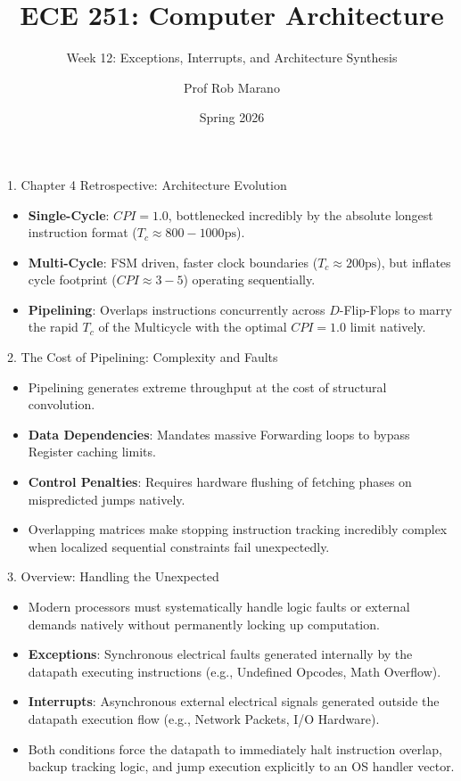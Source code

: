 \documentclass[aspectratio=169]{beamer}
\title{ECE 251: Computer Architecture}
\subtitle{Week 12: Exceptions, Interrupts, and Architecture Synthesis}
\author{Prof Rob Marano}
\date{Spring 2026}
\begin{document}
\begin{frame}
  \titlepage
\end{frame}

\begin{frame}{1. Chapter 4 Retrospective: Architecture Evolution}
\begin{itemize}
    \item \textbf{Single-Cycle}: $CPI=1.0$, bottlenecked incredibly by the absolute longest instruction format ($T_c \approx 800-1000\text{ps}$).
    \item \textbf{Multi-Cycle}: FSM driven, faster clock boundaries ($T_c \approx 200\text{ps}$), but inflates cycle footprint ($CPI \approx 3-5$) operating sequentially.
    \item \textbf{Pipelining}: Overlaps instructions concurrently across $D$-Flip-Flops to marry the rapid $T_c$ of the Multicycle with the optimal $CPI = 1.0$ limit natively.
\end{itemize}
\end{frame}

\begin{frame}{2. The Cost of Pipelining: Complexity and Faults}
\begin{itemize}
    \item Pipelining generates extreme throughput at the cost of structural convolution.
    \item \textbf{Data Dependencies}: Mandates massive Forwarding loops to bypass Register caching limits.
    \item \textbf{Control Penalties}: Requires hardware flushing of fetching phases on mispredicted jumps natively.
    \item Overlapping matrices make stopping instruction tracking incredibly complex when localized sequential constraints fail unexpectedly.
\end{itemize}
\end{frame}

\begin{frame}{3. Overview: Handling the Unexpected}
\begin{itemize}
    \item Modern processors must systematically handle logic faults or external demands natively without permanently locking up computation.
    \item \textbf{Exceptions}: Synchronous electrical faults generated internally by the datapath executing instructions (e.g., Undefined Opcodes, Math Overflow).
    \item \textbf{Interrupts}: Asynchronous external electrical signals generated outside the datapath execution flow (e.g., Network Packets, I/O Hardware).
    \item Both conditions force the datapath to immediately halt instruction overlap, backup tracking logic, and jump execution explicitly to an OS handler vector.
\end{itemize}
\end{frame}
\end{document}
